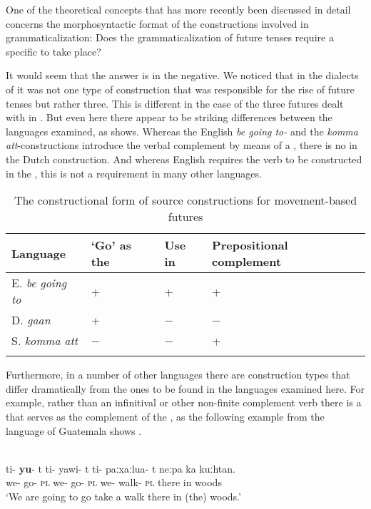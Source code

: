 \documentclass[output=paper]{langsci/langscibook}
\begin{document}
One of the theoretical concepts that has more recently been discussed in detail concerns the morphosyntactic format of the constructions involved in grammaticalization: Does the grammaticalization of future tenses require a specific  to take place?



  It would seem that the answer is in the negative. We noticed that in the dialects of  it was not one type of construction that was responsible for the rise of future tenses but rather three. This is different in the case of the three  futures dealt with in . But even here there appear to be striking differences between the languages examined, as  shows. Whereas the English \textit{be going to-} and the  \textit{komma att}-constructions introduce the verbal complement by means of a , there is no  in the Dutch construction. And whereas English requires the verb to be constructed in the , this is not a requirement in many other languages.



\begin{table}
\caption{The constructional form of source constructions for movement-based futures}
\label{tab:heine:6}

\begin{tabularx}{\textwidth}{lQQQ}
\lsptoprule
Language & `Go' as the & Use in & Prepositional complement\\
\midrule
E. \textit{be going to} & +& +& +\\
D. \textit{gaan} & +& −& −\\
S. \textit{komma att} & −& −& +\\
\lspbottomrule
\end{tabularx}
\end{table}

Furthermore, in a number of other languages there are construction types that differ dramatically from the ones to be found in the languages examined here. For example, rather than an infinitival or other non-finite complement verb there is a  that serves as the complement of the , as the following example from the  language of Guatemala shows \citep{Campbell1987}.



\ea%
    \label{ex:14}
\\ 
\gll ti- \textbf{yu}-  t   ti-  yawi-  t           ti-  paːxaːlua- t          neːpa   ka  kuːhtan.\\
     we-  go-  \textsc{pl} we-  go-   \textsc{pl}  we- walk-         \textsc{pl}  there   in  woods\\
\glt ‘We are going to go take a walk there in (the) woods.’
\z
\end{document}
